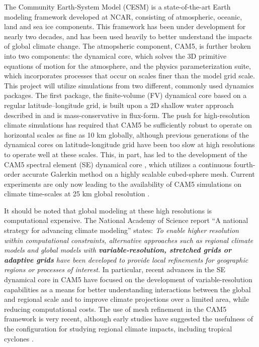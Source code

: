 \documentclass[11pt]{article}
\begin{document}
The Community Earth-System Model (CESM) \citep{RBNetal2010NCAR} is a state-of-the-art Earth modeling framework developed at NCAR, consisting of atmospheric, oceanic, land and sea ice components.  This framework has been under development for nearly two decades, and has been used heavily to better understand the impacts of global climate change.  The atmopsheric component, CAM5, is further broken into two components: the dynamical core, which solves the 3D primitive equations of motion for the atmosphere, and the physics parameterization suite, which incorporates processes that occur on scales finer than the model grid scale. This project will utilize simulations from two different, commonly used dynamics packages. The first package, the finite-volume (FV) dynamical core based on a regular latitude--longitude grid, is built upon a 2D shallow water approach described in \citet{Lin1996,Lin1997} and is mass-conservative in flux-form. The push for high-resolution climate simulations has required that CAM5 be sufficiently robust to operate on horizontal scales as fine as 10 km globally, although previous generations of the dynamical cores on latitude-longitude grid have been too slow at high resolutions to operate well at these scales.  This, in part, has led to the development of the CAM5 spectral element (SE) dynamical core \citep{dennis2012cam}, which utilizes a continuous fourth-order accurate Galerkin method on a highly scalable cubed-sphere mesh.  Current experiments are only now leading to the availability of CAM5 simulations on climate time-scales at 25 km global resolution \citep{Bacmeister2014, Wehner2014, Wehner2015, Reed2015b}.

It should be noted that global modeling at these high resolutions is computational expensive.  The National Academy of Science report ``A national strategy for advancing climate modeling'' states: \textit{To enable higher resolution within computational constraints, alternative approaches such as regional climate models and global models with \textbf{variable-resolution, stretched grids or adaptive grids} have been developed to provide local refinements for geographic regions or processes of interest.}  In particular, recent advances in the SE dynamical core in CAM5 have focused on the development of variable-resolution capabilities as a means for better understanding interactions between the global and regional scale and to improve climate projections over a limited area, while reducing computational costs. The use of mesh refinement in the CAM5 framework is very recent, although early studies have suggested the usefulness of the configuration for studying regional climate impacts, including tropical cyclones \citep{Zarzycki2014multidecadal, Zarzycki2015clim}.
\end{document}
